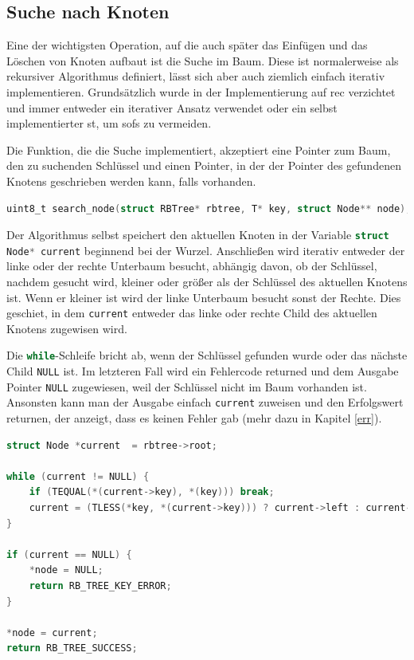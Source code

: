 \documentclass[11pt]{article}
\newcommand{\lstin}[1]{\lstinline[language=C]{#1}}
\begin{document}
\subsection{Suche nach Knoten} \label{sea}
Eine der wichtigsten Operation, auf die auch später das Einfügen und das Löschen von Knoten aufbaut ist die Suche im Baum. Diese ist normalerweise als rekursiver Algorithmus definiert, lässt sich aber auch ziemlich einfach iterativ implementieren.
Grundsätzlich wurde in der Implementierung auf \gls{rec} verzichtet und immer entweder ein iterativer Ansatz verwendet oder ein selbst implementierter \gls{st}, um \glspl{sof} zu vermeiden.

Die Funktion, die die Suche implementiert, akzeptiert eine Pointer zum Baum, den zu suchenden Schlüssel und einen Pointer, in der der Pointer des gefundenen Knotens geschrieben werden kann, falls vorhanden.

\begin{lstlisting}[language=C]
uint8_t search_node(struct RBTree* rbtree, T* key, struct Node** node);
\end{lstlisting}

Der Algorithmus selbst speichert den aktuellen Knoten in der Variable \lstin{struct Node* current} beginnend bei der Wurzel. Anschließen wird iterativ entweder der linke oder der rechte Unterbaum besucht, abhängig davon, ob der Schlüssel, nachdem gesucht wird, kleiner oder größer als der Schlüssel des aktuellen Knotens ist.
Wenn er kleiner ist wird der linke Unterbaum besucht sonst der Rechte. Dies geschiet, in dem \lstin{current} entweder das linke oder rechte Child des aktuellen Knotens zugewisen wird.

Die \lstin{while}-Schleife bricht ab, wenn der Schlüssel gefunden wurde oder das nächste Child \lstin{NULL} ist. Im letzteren Fall wird ein Fehlercode returned und dem Ausgabe Pointer \lstin{NULL} zugewiesen, weil der Schlüssel nicht im Baum vorhanden ist.
Ansonsten kann man der Ausgabe einfach \lstin{current} zuweisen und den Erfolgswert returnen, der anzeigt, dass es keinen Fehler gab (mehr dazu in Kapitel \ref{err}).

\begin{lstlisting}[language=C]
struct Node *current  = rbtree->root;

while (current != NULL) {
    if (TEQUAL(*(current->key), *(key))) break;
    current = (TLESS(*key, *(current->key))) ? current->left : current->right;
}

if (current == NULL) {
    *node = NULL;
    return RB_TREE_KEY_ERROR;
}

*node = current;
return RB_TREE_SUCCESS;
\end{lstlisting}
\end{document}
